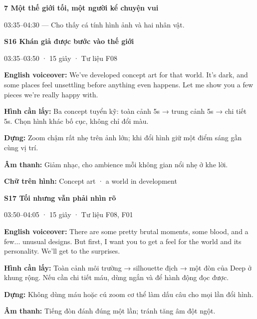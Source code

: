 \documentclass[10pt,a4paper]{article}
\begin{document}
\textbf{7 Một thế giới tối, một người kể chuyện vui}\par

03:35–04:30 — Cho thấy cá tính hình ảnh và hai nhân vật.\par

\textbf{S16 Khán giả được bước vào thế giới}\par

03:35–03:50 · 15 giây · Tư liệu F08\par

\textbf{English voiceover:}  We’ve developed concept art for that world. It’s dark, and some places feel unsettling before anything even happens. Let me show you a few pieces we’re really happy with.\par

\textbf{Hình cần lấy:}  Ba concept tuyển kỹ: toàn cảnh 5s → trung cảnh 5s → chi tiết 5s. Chọn hình khác bố cục, không chỉ đổi màu.\par

\textbf{Dựng:}  Zoom chậm rất nhẹ trên ảnh lớn; khi đổi hình giữ một điểm sáng gần cùng vị trí.\par

\textbf{Âm thanh:}  Giảm nhạc, cho ambience mỗi không gian nổi nhẹ ở khe lời.\par

\textbf{Chữ trên hình:}  Concept art · a world in development\par

\textbf{S17 Tối nhưng vẫn phải nhìn rõ}\par

03:50–04:05 · 15 giây · Tư liệu F08, F01\par

\textbf{English voiceover:}  There are some pretty brutal moments, some blood, and a few... unusual designs. But first, I want you to get a feel for the world and its personality. We’ll get to the surprises.\par

\textbf{Hình cần lấy:}  Toàn cảnh môi trường → silhouette địch → một đòn của Deep ở khung rộng. Nếu cần chi tiết máu, dùng ngắn và để hành động đọc được.\par

\textbf{Dựng:}  Không dùng máu hoặc cú zoom cơ thể làm dấu câu cho mọi lần đổi hình.\par

\textbf{Âm thanh:}  Tiếng đòn đánh đúng một lần; tránh tăng âm đột ngột.\par
\end{document}
